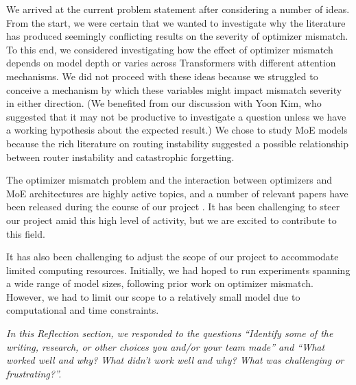 \documentclass[11pt,a4paper]{article}
\begin{document}
We arrived at the current problem statement after considering a number of ideas. From the start, we were certain that we wanted to investigate why the literature has produced seemingly conflicting results on the severity of optimizer mismatch. To this end, we considered investigating how the effect of optimizer mismatch depends on model depth or varies across Transformers with different attention mechanisms. We did not proceed with these ideas because we struggled to conceive a mechanism by which these variables might impact mismatch severity in either direction. (We benefited from our discussion with Yoon Kim, who suggested that it may not be productive to investigate a question unless we have a working hypothesis about the expected result.) We chose to study MoE models because the rich literature on routing instability suggested a possible relationship between router instability and catastrophic forgetting.

The optimizer mismatch problem and the interaction between optimizers and MoE architectures are highly active topics, and a number of relevant papers have been released during the course of our project \cite{zhao2026ephemeral, hernanz2026muonmakesmixtureofexpertslayer, li2026pretrainingdatascalereverses}. It has been challenging to steer our project amid this high level of activity, but we are excited to contribute to this field.

It has also been challenging to adjust the scope of our project to accommodate limited computing resources. Initially, we had hoped to run experiments spanning a wide range of model sizes, following prior work on optimizer mismatch. However, we had to limit our scope to a relatively small model due to computational and time constraints.

\emph{
In this Reflection section, we responded to the questions \emph{
``Identify some of the writing, research, or other choices you and/or your team made'' 
} and \emph{``What worked well and why? What didn’t work well and why? What was challenging or frustrating?''}.
}



\end{document}
